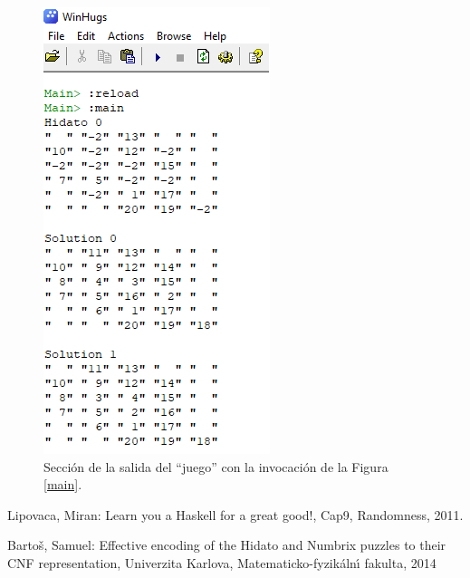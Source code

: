 \documentclass{llncs}
\begin{document}
\begin{figure}
\begin{center}
\includegraphics[width= .5\columnwidth]{figuras/corrida}
\end{center}
\caption{Secci\'on de la salida del ``juego'' con la invocaci\'on de la Figura \ref{main}.}
\label{corrida}
\end{figure}
\begin{thebibliography}{5}  
    Lipovaca, Miran: 
    Learn you a Haskell for a great good!,
    Cap9, Randomness,
    2011.
    
	Barto{\v{s}}, Samuel:
	Effective encoding of the Hidato and Numbrix puzzles to their CNF representation,
	Univerzita Karlova, Matematicko-fyzik{\'a}ln{\'\i} fakulta,
	2014
\end{thebibliography}
\end{document}
